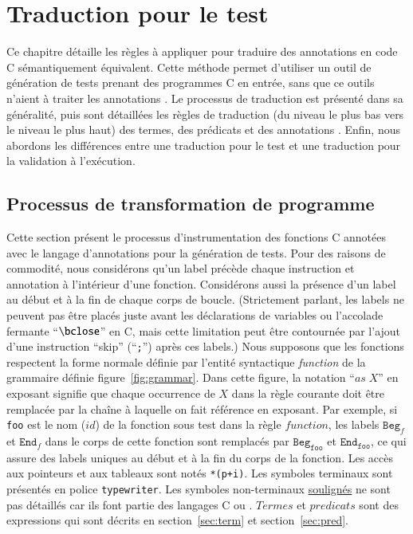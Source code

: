
\chapter{Traduction pour le test}
\label{sec:traduction}

\chapterintro


Ce chapitre détaille les règles à appliquer pour traduire des annotations \acsl
en code C sémantiquement équivalent.
Cette méthode permet d'utiliser un outil de génération de tests prenant des
programmes C en entrée, sans que ce outils n'aient à traiter les annotations
\acsl.
Le processus de traduction est présenté dans sa généralité, puis sont détaillées
les règles de traduction (du niveau le plus bas vers le niveau le plus haut) des
termes, des prédicats et des annotations \acsl.
Enfin, nous abordons les différences entre une traduction pour le test et une
traduction pour la validation à l'exécution.


\section{Processus de transformation de programme}




Cette section présent le processus d'instrumentation des fonctions C annotées
avec le langage d'annotations \acsl pour la génération de tests.
Pour des raisons de commodité, nous considérons qu'un label précède chaque
instruction et annotation à l'intérieur d'une fonction.
Considérons aussi la présence d'un label au début et à la fin de chaque corps de
boucle.
(Strictement parlant, les labels ne peuvent pas être placés juste avant les
déclarations de variables ou l'accolade fermante ``$\bclose$'' en C, mais
cette limitation peut être contournée par l'ajout d'une instruction ``skip''
(``\lstinline{;}'') après ces labels.)
Nous supposons que les fonctions respectent la forme normale définie par
l'entité syntactique \textit{function} de la grammaire définie
figure~\ref{fig:grammar}. 
Dans cette figure, la notation ``${\textit{as}\;X}$'' en exposant signifie que
chaque occurrence de $X$ dans la règle courante doit être remplacée par la
chaîne à laquelle on fait référence en exposant.
Par exemple, si \texttt{foo} est le nom ($id$) de la fonction sous test dans la
règle $function$, les labels $\texttt{Beg}_f$ et $\texttt{End}_f$ dans le corps
de cette fonction sont remplacés par $\texttt{Beg}_{\texttt{foo}}$ et
$\texttt{End}_{\texttt{foo}}$, ce qui assure des labels uniques au début et à la
fin du corps de la fonction.
Les accès aux pointeurs et aux tableaux sont notés \lstinline|*(p+i)|.
Les symboles terminaux sont présentés en police \texttt{typewriter}.
Les symboles non-terminaux \underline{soulignés} ne sont pas détaillés car ils
font partie des langages C ou \acsl.
$Termes$ et $predicats$ sont des expressions \acsl qui sont décrits en
section~\ref{sec:term} et section~\ref{sec:pred}.


